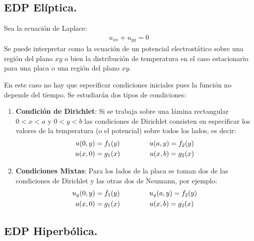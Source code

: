 \subsection{EDP Elíptica.}

Sea la ecuación de Laplace:
\begin{align*}
u_{xx} + u_{yy} = 0
\end{align*}
Se puede interpretar como la ecuación de un potencial electrostático sobre una región del plano $xy$ o bien la distribución de temperatura en el caso estacionario para una placa o una región del plano $xy$.
\par
En este caso no hay que especificar condiciones iniciales pues la función no depende del tiempo. Se estudiarán dos tipos de condiciones:
\begin{enumerate}
\item \textbf{Condición de Dirichlet}: Si se trabaja sobre una lámina rectangular $0 < x < a$ y $0 < y < b$ las condiciones de Dirichlet consisten en especificar los valores de la temperatura (o el potencial) sobre todos los lados, es decir:
\begin{align}
\begin{aligned}
u(0, y) &= f_{1}(y) \hspace{1.5cm} u(a, y) = f_{2}(y) \\
u(x, 0) &= g_{1}(x) \hspace{1.5cm} u(x, b) = g_{2}(x)
\end{aligned}
\label{eq:ecuacion_06_02_05}
\end{align}
\item \textbf{Condiciones Mixtas}: Para los lados de la placa se toman dos de las condiciones de Dirichlet y las otras dos de Neumann, por ejemplo:
\begin{align}
\begin{aligned}
u_{y}(0, y) &= f_{1}(y) \hspace{1.5cm} u_{y}(a, y) = f_{2}(y) \\
u(x, 0) &= g_{1}(x) \hspace{1.5cm} u(x, b) = g_{2}(x)
\end{aligned}
\label{eq:ecuacion_06_01_06}
\end{align}
\end{enumerate}

\subsection{EDP Hiperbólica.}


